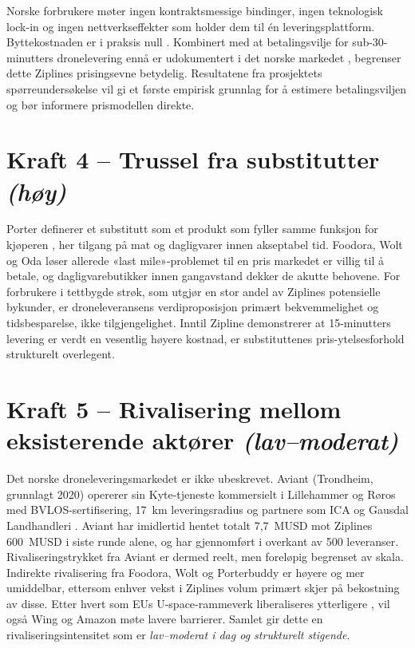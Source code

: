 \documentclass[12pt, a4paper]{article}
\begin{document}
Norske forbrukere møter ingen kontraktsmessige bindinger, ingen teknologisk
lock-in og
ingen nettverkseffekter som holder dem til én leveringsplattform.
Byttekostnaden er i
praksis null \parencite[24]{porter1980}. Kombinert med at betalingsvilje for
sub-30-minutters dronelevering ennå er udokumentert i det norske markedet
\parencite[7]{pfeifer2005}, begrenser dette Ziplines prisingsevne betydelig.
Resultatene fra prosjektets spørreundersøkelse vil gi et første empirisk
grunnlag for
å estimere betalingsviljen og bør informere prismodellen direkte.

\section{Kraft 4 – Trussel fra substitutter \normalfont\textit{(høy)}}

Porter definerer et substitutt som et produkt som fyller samme funksjon for
kjøperen
\parencite[23]{porter1980}, her tilgang på mat og dagligvarer innen akseptabel
tid.
Foodora, Wolt og Oda løser allerede «last mile»-problemet
\parencite{gevaers2011}
til en pris markedet er villig til å betale, og dagligvarebutikker innen
gangavstand
dekker de akutte behovene. For forbrukere i tettbygde strøk, som utgjør en
stor andel
av Ziplines potensielle bykunder, er droneleveransens verdiproposisjon primært
bekvemmelighet og tidsbesparelse, ikke tilgjengelighet. Inntil Zipline
demonstrerer
at 15-minutters levering er verdt en vesentlig høyere kostnad, er
substituttenes
pris-ytelsesforhold strukturelt overlegent.

\section{Kraft 5 – Rivalisering mellom eksisterende aktører
\normalfont\textit{(lav–moderat)}}

Det norske droneleveringsmarkedet er ikke ubeskrevet. Aviant (Trondheim,
grunnlagt
2020) opererer sin Kyte-tjeneste kommersielt i Lillehammer og Røros med
BVLOS-sertifisering, 17~km leveringsradius og partnere som ICA og Gausdal
Landhandleri
\parencite{aviant2024}. Aviant har imidlertid hentet totalt 7,7~MUSD mot
Ziplines
600~MUSD i siste runde alene, og har gjennomført i overkant av 500 leveranser.
Rivaliseringstrykket fra Aviant er dermed reelt, men foreløpig begrenset av
skala.
Indirekte rivalisering fra Foodora, Wolt og Porterbuddy er høyere og mer
umiddelbar,
ettersom enhver vekst i Ziplines volum primært skjer på bekostning av disse.
Etter hvert som EUs U-space-rammeverk liberaliseres ytterligere
\parencite{euuas2021},
vil også Wing og Amazon møte lavere barrierer. Samlet gir dette en
rivaliseringsintensitet
som er \textit{lav–moderat i dag og strukturelt stigende}.
\end{document}
